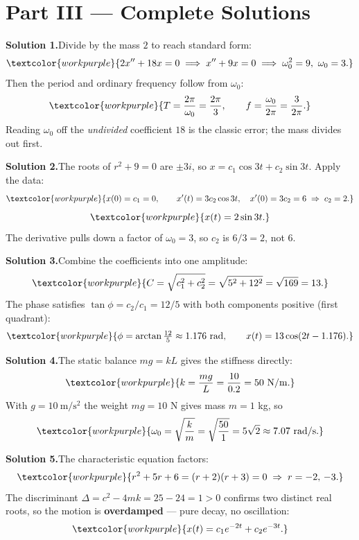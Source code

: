 \clearpage
{}
{}
\section*{Part III --- Complete Solutions}

\noindent\textbf{Solution 1.}\quad Divide by the mass $2$ to reach standard form:
\[ \textcolor{workpurple}{2x'' + 18x = 0 \;\Longrightarrow\; x'' + 9x = 0 \;\Longrightarrow\; \omega_0^{2} = 9,\ \omega_0 = 3.} \]
Then the period and ordinary frequency follow from $\omega_0$:
\[ \textcolor{workpurple}{T = \frac{2\pi}{\omega_0} = \frac{2\pi}{3}, \qquad f = \frac{\omega_0}{2\pi} = \frac{3}{2\pi}.} \]
Reading $\omega_0$ off the \emph{undivided} coefficient $18$ is the classic error;
the mass divides out first.

\medskip
\noindent\textbf{Solution 2.}\quad The roots of $r^2+9=0$ are $\pm 3i$, so
$x = c_1\cos 3t + c_2\sin 3t$. Apply the data:
\[ \textcolor{workpurple}{x(0) = c_1 = 0, \qquad x'(t) = 3c_2\cos 3t,\quad x'(0) = 3c_2 = 6 \;\Rightarrow\; c_2 = 2.} \]
\[ \textcolor{workpurple}{x(t) = 2\sin 3t.} \]
The derivative pulls down a factor of $\omega_0 = 3$, so $c_2$ is $6/3=2$, not $6$.

\medskip
\noindent\textbf{Solution 3.}\quad Combine the coefficients into one amplitude:
\[ \textcolor{workpurple}{C = \sqrt{c_1^2 + c_2^2} = \sqrt{5^2 + 12^2} = \sqrt{169} = 13.} \]
The phase satisfies $\tan\phi = c_2/c_1 = 12/5$ with both components positive
(first quadrant):
\[ \textcolor{workpurple}{\phi = \arctan\tfrac{12}{5} \approx 1.176\ \text{rad}, \qquad x(t) = 13\cos(2t - 1.176).} \]

\medskip
\noindent\textbf{Solution 4.}\quad The static balance $mg = kL$ gives the stiffness
directly:
\[ \textcolor{workpurple}{k = \frac{mg}{L} = \frac{10}{0.2} = 50\ \mathrm{N/m}.} \]
With $g = 10\ \mathrm{m/s^2}$ the weight $mg = 10$ N gives mass $m = 1$ kg, so
\[ \textcolor{workpurple}{\omega_0 = \sqrt{\frac{k}{m}} = \sqrt{\frac{50}{1}} = 5\sqrt{2} \approx 7.07\ \mathrm{rad/s}.} \]

\medskip
\noindent\textbf{Solution 5.}\quad The characteristic equation factors:
\[ \textcolor{workpurple}{r^2 + 5r + 6 = (r+2)(r+3) = 0 \;\Rightarrow\; r = -2,\,-3.} \]
The discriminant $\Delta = c^2 - 4mk = 25 - 24 = 1 > 0$ confirms two distinct real
roots, so the motion is \textbf{overdamped} --- pure decay, no oscillation:
\[ \textcolor{workpurple}{x(t) = c_1 e^{-2t} + c_2 e^{-3t}.} \]

